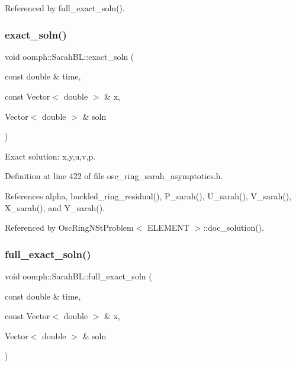 Referenced by full\+\_\+exact\+\_\+soln().

\mbox{\label{namespaceoomph_1_1SarahBL_aa198aa1de07bb9a2eac422ed63010bc4}} 
\subsubsection{\texorpdfstring{exact\+\_\+soln()}{exact\_soln()}}
{\footnotesize\ttfamily void oomph\+::\+Sarah\+B\+L\+::exact\+\_\+soln (\begin{DoxyParamCaption}\item[{const double \&}]{time,  }\item[{const Vector$<$ double $>$ \&}]{x,  }\item[{Vector$<$ double $>$ \&}]{soln }\end{DoxyParamCaption})}



Exact solution\+: x,y,u,v,p. 



Definition at line 422 of file osc\+\_\+ring\+\_\+sarah\+\_\+asymptotics.\+h.



References alpha, buckled\+\_\+ring\+\_\+residual(), P\+\_\+sarah(), U\+\_\+sarah(), V\+\_\+sarah(), X\+\_\+sarah(), and Y\+\_\+sarah().



Referenced by Osc\+Ring\+N\+St\+Problem$<$ E\+L\+E\+M\+E\+N\+T $>$\+::doc\+\_\+solution().

\mbox{\label{namespaceoomph_1_1SarahBL_a80c7c03073f6436ace00d2b2c5bfa501}} 
\subsubsection{\texorpdfstring{full\+\_\+exact\+\_\+soln()}{full\_exact\_soln()}}
{\footnotesize\ttfamily void oomph\+::\+Sarah\+B\+L\+::full\+\_\+exact\+\_\+soln (\begin{DoxyParamCaption}\item[{const double \&}]{time,  }\item[{const Vector$<$ double $>$ \&}]{x,  }\item[{Vector$<$ double $>$ \&}]{soln }\end{DoxyParamCaption})}



